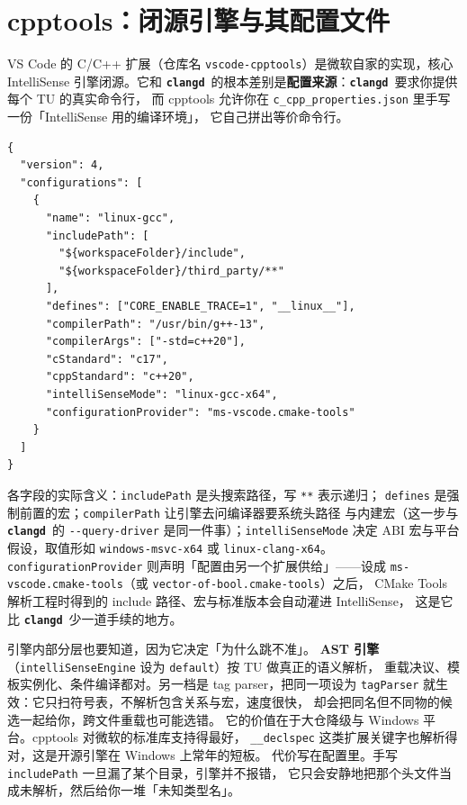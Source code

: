 \documentclass[12pt,a4paper,fontset=fandol]{ctexbook}
\newcommand{\Opt}[1]{\texttt{-\/-#1}}
\newcommand{\Bk}{\discretionary{}{}{}}
\newcommand{\Lib}[1]{\textbf{\texttt{#1}}}
\newcommand{\CD}{\Lib{clangd}}
\begin{document}
\section{cpptools：闭源引擎与其配置文件}\label{sec:ch06-s3}

VS Code 的 C/C++ 扩展（仓库名 \texttt{vscode-cpptools}）是微软自家的实现，核心 IntelliSense
引擎闭源。它和 \CD\ 的根本差别是\textbf{配置来源}：\CD\ 要求你提供每个 TU 的真实命令行，
而 cpptools 允许你在 \texttt{c\_cpp\_properties.json} 里手写一份「IntelliSense 用的编译环境」，
它自己拼出等价命令行。

\begin{lstlisting}[style=jsonstyle,caption={c\_cpp\_properties.json：把编译环境显式写给闭源引擎},label={lst:ch06-cpptools}]
{
  "version": 4,
  "configurations": [
    {
      "name": "linux-gcc",
      "includePath": [
        "${workspaceFolder}/include",
        "${workspaceFolder}/third_party/**"
      ],
      "defines": ["CORE_ENABLE_TRACE=1", "__linux__"],
      "compilerPath": "/usr/bin/g++-13",
      "compilerArgs": ["-std=c++20"],
      "cStandard": "c17",
      "cppStandard": "c++20",
      "intelliSenseMode": "linux-gcc-x64",
      "configurationProvider": "ms-vscode.cmake-tools"
    }
  ]
}
\end{lstlisting}

各字段的实际含义：\texttt{includePath} 是头搜索路径，写 \texttt{**} 表示递归；
\texttt{defines} 是强制前置的宏；\texttt{compilerPath} 让引擎去问编译器要系统头路径
与内建宏（这一步与 \CD\ 的 \Opt{query-driver} 是同一件事）；\texttt{intelliSenseMode}
决定 ABI 宏与平台假设，取值形如 \texttt{windows-msvc-x64} 或 \texttt{linux-clang-x64}。
\texttt{configurationProvider} 则声明「配置由另一个扩展供给」——设成
\texttt{ms-vscode.cmake-tools}（或 \texttt{vector-of-bool\allowbreak.cmake-tools}）之后，
CMake Tools 解析工程时得到的 include 路径、宏与标准版本会自动灌进 IntelliSense，
这是它比 \CD\ 少一道手续的地方。

引擎内部分层也要知道，因为它决定「为什么跳不准」。
\textbf{AST 引擎}（\texttt{intelli\Bk SenseEngine} 设为 \texttt{default}）按 TU 做真正的语义解析，
重载决议、模板实例化、条件编译都对。另一档是 tag parser，把同一项设为
\texttt{tagParser} 就生效：它只扫符号表，不解析包含关系与宏，速度很快，
却会把同名但不同物的候选一起给你，跨文件重载也可能选错。
它的价值在于大仓降级与 Windows 平台。cpptools 对微软的标准库支持得最好，
\texttt{\_\_declspec} 这类扩展关键字也解析得对，这是开源引擎在 Windows 上常年的短板。
代价写在配置里。手写 \texttt{includePath} 一旦漏了某个目录，引擎并不报错，
它只会安静地把那个头文件当成未解析，然后给你一堆「未知类型名」。
\end{document}
